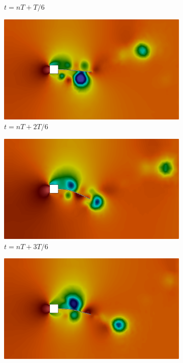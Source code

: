 \begin{figure}[h!]
\begin{subfigure}[b]{0.49\textwidth}
        \caption{$t=nT+T/6$}
    \end{subfigure}
    \begin{subfigure}[b]{0.49\textwidth}
        \includegraphics[width=\linewidth]{Figuras/FSI-prism2/pT3.png}
        \caption{$t=nT+2T/6$}
    \end{subfigure}
    \begin{subfigure}[b]{0.49\textwidth}
        \includegraphics[width=\linewidth]{Figuras/FSI-prism2/pT4.png}
        \caption{$t=nT+3T/6$}
    \end{subfigure}
    \begin{subfigure}[b]{0.49\textwidth}
        \includegraphics[width=\linewidth]{Figuras/FSI-prism2/pT5.png}

\end{subfigure}
\end{figure}

